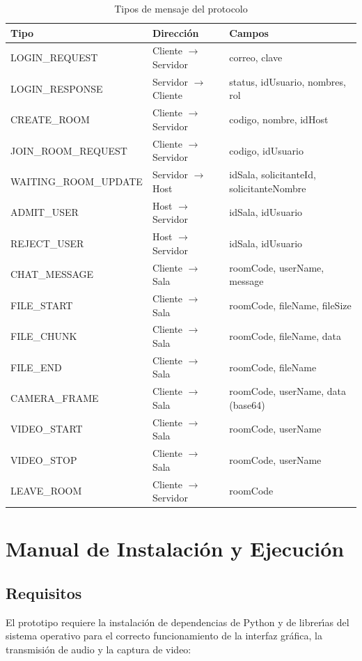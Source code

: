 \documentclass[12pt,a4paper]{article}
\begin{document}
\begin{table}[htbp]
    \centering
    \small
    \begin{tabular}{>{\raggedright\arraybackslash}p{4.5cm}p{2.5cm}p{8.5cm}}
    \toprule
    \textbf{Tipo} & \textbf{Direcci\'on} & \textbf{Campos} \\
    \midrule
    LOGIN\_REQUEST   & Cliente $\rightarrow$ Servidor & correo, clave \\
    LOGIN\_RESPONSE  & Servidor $\rightarrow$ Cliente & status, idUsuario, nombres, rol \\
    CREATE\_ROOM     & Cliente $\rightarrow$ Servidor & codigo, nombre, idHost \\
    JOIN\_ROOM\_REQUEST & Cliente $\rightarrow$ Servidor & codigo, idUsuario \\
    WAITING\_ROOM\_UPDATE & Servidor $\rightarrow$ Host & idSala, solicitanteId, solicitanteNombre \\
    ADMIT\_USER      & Host $\rightarrow$ Servidor & idSala, idUsuario \\
    REJECT\_USER     & Host $\rightarrow$ Servidor & idSala, idUsuario \\
    CHAT\_MESSAGE    & Cliente $\rightarrow$ Sala & roomCode, userName, message \\
    FILE\_START      & Cliente $\rightarrow$ Sala & roomCode, fileName, fileSize \\
    FILE\_CHUNK      & Cliente $\rightarrow$ Sala & roomCode, fileName, data \\
    FILE\_END        & Cliente $\rightarrow$ Sala & roomCode, fileName \\
    CAMERA\_FRAME    & Cliente $\rightarrow$ Sala & roomCode, userName, data (base64) \\
    VIDEO\_START     & Cliente $\rightarrow$ Sala & roomCode, userName \\
    VIDEO\_STOP      & Cliente $\rightarrow$ Sala & roomCode, userName \\
    LEAVE\_ROOM      & Cliente $\rightarrow$ Servidor & roomCode \\
    \bottomrule
    \end{tabular}
    \caption{Tipos de mensaje del protocolo}
\end{table}

\section{Manual de Instalaci\'on y Ejecuci\'on}

\subsection{Requisitos}
El prototipo requiere la instalaci\'on de dependencias de Python y de librer\'{\i}as del sistema operativo para el correcto funcionamiento de la interfaz gr\'afica, la transmisi\'on de audio y la captura de video:
\end{document}
